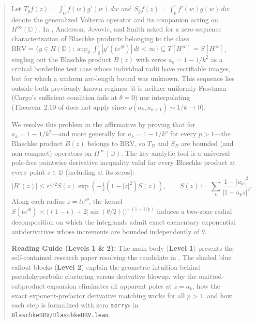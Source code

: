 \documentclass[11pt,reqno]{amsart}
\numberwithin{equation}{section}
\newcommand{\D}{\mathbb{D}}
\newcommand{\BRV}{\mathrm{BRV}}
\begin{document}
\begin{abstract}
Let $T_g f(z) = \int_0^z f(w) g'(w)\,dw$ and $S_g f(z) = \int_0^z f'(w) g(w)\,dw$ denote the generalized Volterra operator and its companion acting on $H^\infty(\D)$. In \cite[Problem~4.3]{AJS14}, Anderson, Jovovic, and Smith asked for a zero-sequence characterization of Blaschke products belonging to the class $\BRV = \{g \in H(\D) : \sup_{\theta} \int_0^1 |g'(te^{i\theta})|\,dt < \infty\} \subseteq T[H^\infty] = S[H^\infty]$, singling out the Blaschke product $B(z)$ with zeros $a_k = 1 - 1/k^2$ as a critical borderline test case whose individual radii have rectifiable images, but for which a uniform arc-length bound was unknown. This sequence lies outside both previously known regimes: it is neither uniformly Frostman (Cargo's sufficient condition fails at $\theta = 0$) nor interpolating (Theorem~2.10 of \cite{AJS14} does not apply since $\rho(a_k, a_{k+1}) \sim 1/k \to 0$).

We resolve this problem in the affirmative by proving that for $a_k = 1 - 1/k^2$---and more generally for $a_k = 1 - 1/k^p$ for every $p > 1$---the Blaschke product $B(z)$ belongs to $\BRV$, so $T_B$ and $S_B$ are bounded (and non-compact) operators on $H^\infty(\D)$. The key analytic tool is a universal pole-free pointwise derivative inequality valid for every Blaschke product at every point $z \in \D$ (including at its zeros):
\[
  |B'(z)| \le e^{1/2} S(z) \exp\!\left(-\tfrac{1}{2}(1 - |z|^2) S(z)\right), \qquad S(z) := \sum_{k} \frac{1 - |a_k|^2}{|1 - \bar{a}_k z|^2}.
\]
Along each radius $z = t e^{i\theta}$, the kernel $S(t e^{i\theta}) \asymp \bigl((1 - t) + 2|\sin(\theta/2)|\bigr)^{-(1 + 1/p)}$ induces a two-zone radial decomposition on which the integrands admit exact elementary exponential antiderivatives whose increments are bounded independently of $\theta$.

\medskip
\noindent\textbf{Reading Guide (Levels 1 \& 2):} The main body (\textbf{Level 1}) presents the self-contained research paper resolving the candidate in \cite[Problem~4.3]{AJS14}. The shaded blue callout blocks (\textbf{Level 2}) explain the geometric intuition behind pseudohyperbolic clustering versus derivative blowup, why the omitted-subproduct expansion eliminates all apparent poles at $z = a_k$, how the exact exponent-prefactor derivative matching works for all $p > 1$, and how each step is formalized with zero \texttt{sorry}s in \texttt{BlaschkeBRV/BlaschkeBRV.lean}.
\end{abstract}

\maketitle
\end{document}
